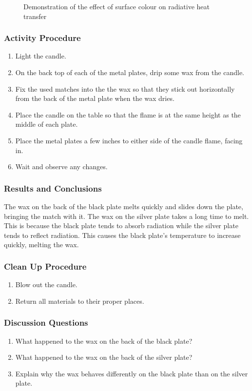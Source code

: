 \begin{figure}
\begin{center}
\def\svgwidth{200pt}

\caption{Demonstration of the effect of surface colour on radiative heat transfer}
\label{fig:radiation}
\end{center}
\end{figure}

\subsubsection*{Activity Procedure}
\begin{enumerate}
\item{Light the candle.}
\item{On the back top of each of the metal plates, drip some wax from the candle.}
\item{Fix the used matches into the the wax so that they stick out horizontally from the back of the metal plate when the wax dries.}
\item{Place the candle on the table so that the flame is at the same height as the middle of each plate.}
\item{Place the metal plates a few inches to either side of the candle flame, facing in.}
\item{Wait and observe any changes.}
\end{enumerate}

\subsubsection*{Results and Conclusions}
The wax on the back of the black plate melts quickly and slides down the plate, bringing the match with it.  The wax on the silver plate takes a long time to melt.  This is because the black plate tends to absorb radiation while the silver plate tends to reflect radiation.  This causes the black plate's temperature to increase quickly, melting the wax.

\subsubsection*{Clean Up Procedure}
\begin{enumerate}
\item{Blow out the candle.}
\item{Return all materials to their proper places.}
\end{enumerate}

\subsubsection*{Discussion Questions}
\begin{enumerate}
\item{What happened to the wax on the back of the black plate?}
\item{What happened to the wax on the back of the silver plate?}
\item{Explain why the wax behaves differently on the black plate than on the silver plate.}
\end{enumerate}

